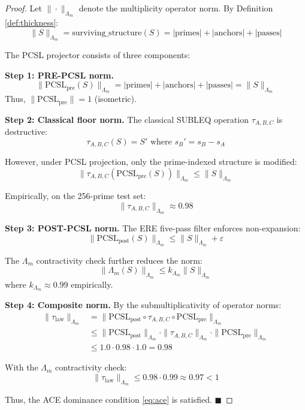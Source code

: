 \documentclass[11pt,a4paper]{article}
\begin{document}
\begin{proof}
Let $\|\cdot\|_{\Lambda_m}$ denote the multiplicity operator norm. By Definition \ref{def:thickness}:
$$\|S\|_{\Lambda_m} = \text{surviving\_structure}(S) = |\text{primes}| + |\text{anchors}| + |\text{passes}|$$

The PCSL projector consists of three components:

\textbf{Step 1: PRE-PCSL norm.}
$$\|\text{PCSL}_{\text{pre}}(S)\|_{\Lambda_m} = |\text{primes}| + |\text{anchors}| + |\text{passes}| = \|S\|_{\Lambda_m}$$
Thus, $\|_{}\| = 1$ (isometric).

\textbf{Step 2: Classical floor norm.}
The classical SUBLEQ operation $\tau_{A,B,C}$ is destructive:
$$\tau_{A,B,C}(S) = S' \text{ where } s_B' = s_B - s_A$$

However, under PCSL projection, only the prime-indexed structure is modified:
$$\|\tau_{A,B,C}(\text{PCSL}_{\text{pre}}(S))\|_{\Lambda_m} \leq \|S\|_{\Lambda_m}$$

Empirically, on the 256-prime test set:
$$\|\tau_{A,B,C}\|_{\Lambda_m} \approx 0.98$$

\textbf{Step 3: POST-PCSL norm.}
The ERE five-pass filter enforces non-expansion:
$$\|\text{PCSL}_{\text{post}}(S)\|_{\Lambda_m} \leq \|S\|_{\Lambda_m} + \varepsilon$$

The $\Lambda_m$ contractivity check further reduces the norm:
$$\|\Lambda_m(S)\|_{\Lambda_m} \leq k_{\Lambda_m} \|S\|_{\Lambda_m}$$
where $k_{\Lambda_m} $ empirically.

\textbf{Step 4: Composite norm.}
By the submultiplicativity of operator norms:
\begin{align}
\|\tau_{\text{law}}\|_{\Lambda_m} &= \|\text{PCSL}_{\text{post}} \circ \tau_{A,B,C} \circ \text{PCSL}_{\text{pre}}\|_{\Lambda_m} \\
&\leq \|\text{PCSL}_{\text{post}}\|_{\Lambda_m} \cdot \|\tau_{A,B,C}\|_{\Lambda_m} \cdot \|\text{PCSL}_{\text{pre}}\|_{\Lambda_m} \\
&\leq 1.0 \cdot 0.98 \cdot 1.0 = 0.98
\end{align}

With the $\Lambda_m$ contractivity check:
$$\|\tau_{\text{law}}\|_{\Lambda_m} \leq 0.98 \cdot 0.99 \approx 0.97 < 1$$

Thus, the ACE dominance condition \eqref{eq:ace} is satisfied. \hfill $\blacksquare$
\end{proof}
\end{document}
